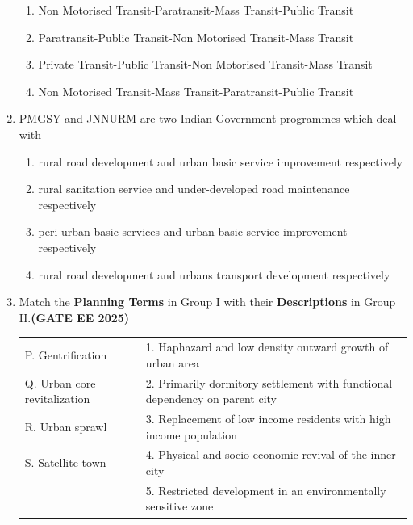 \documentclass[journal,12pt,onecolumn]{IEEEtran}
\theoremstyle{remark}
\begin{document}
\begin{enumerate}
\begin{enumerate}
    \item Non Motorised Transit-Paratransit-Mass Transit-Public Transit
    \item Paratransit-Public Transit-Non Motorised Transit-Mass Transit
    \item Private Transit-Public Transit-Non Motorised Transit-Mass Transit
    \item Non Motorised Transit-Mass Transit-Paratransit-Public Transit
\end{enumerate}
\item PMGSY and JNNURM are two Indian Government programmes which  deal with
\begin{enumerate}
    \item rural road development and urban basic service improvement respectively
    \item rural sanitation service and under-developed road maintenance respectively
    \item peri-urban basic services and urban basic service improvement respectively
    \item rural road development and urbans transport development respectively
\end{enumerate}
\item Match the \textbf{Planning Terms} in Group I with their \textbf{Descriptions} in Group II.\hfill \textbf{(GATE EE 2025)}
\begin{tabular}{p{}p{}}
P. Gentrification     &1. Haphazard and low density outward growth of urban area  \\
Q. Urban core revitalization     &2. Primarily dormitory settlement with functional dependency on parent city\\
R. Urban sprawl   & 3. Replacement of low income residents with high income population\\
S. Satellite town & 4. Physical and socio-economic revival of the inner-city\\
       & 5. Restricted development in an environmentally sensitive zone\\
\end{tabular}
\begin{enumerate}
\end{enumerate}
\end{enumerate}
\end{document}
